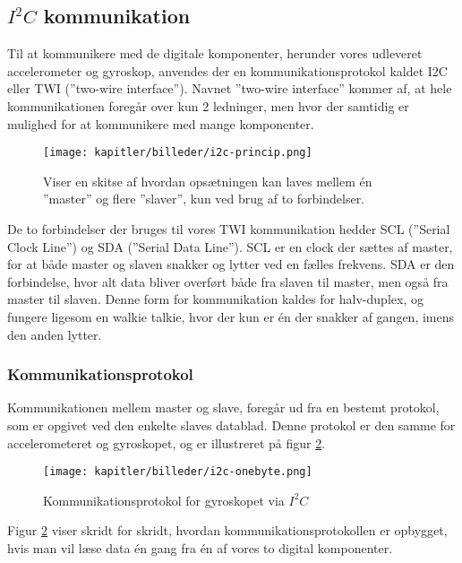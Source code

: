 \newpage

\subsection{$I^2C$ kommunikation}
Til at kommunikere med de digitale komponenter, herunder vores udleveret accelerometer og gyroskop, anvendes der en kommunikationsprotokol kaldet I2C eller TWI (”two-wire interface”). Navnet ”two-wire interface” kommer af, at hele kommunikationen foregår over kun 2 ledninger, men hvor der samtidig er mulighed for at kommunikere med mange komponenter.


\begin{figure}[ht]
    \centering
    \texttt{[image: kapitler/billeder/i2c-princip.png]}
    \caption{Viser en skitse af hvordan opsætningen kan laves mellem
én ”master” og flere ”slaver”, kun ved brug af to forbindelser.}
    \label{fig:i2cprincip}
\end{figure}


De to forbindelser der bruges til vores TWI kommunikation hedder SCL (”Serial Clock Line”) og SDA (”Serial Data Line”). SCL er en clock der sættes af master, for at både master og slaven snakker og lytter ved en fælles frekvens. SDA er den forbindelse, hvor alt data bliver overført både fra slaven til master, men også fra master til slaven. Denne form for kommunikation kaldes for halv-duplex, og fungere ligesom en walkie talkie, hvor der kun er én der snakker af gangen, imens den anden lytter.

\subsubsection{Kommunikationsprotokol}

Kommunikationen mellem master og slave, foregår ud fra en bestemt protokol, som er opgivet ved den enkelte slaves datablad. Denne protokol er den samme for accelerometeret og gyroskopet, og er illustreret på figur \ref{fig:i2conebyte}.

\begin{figure}[ht]
    \centering
    \texttt{[image: kapitler/billeder/i2c-onebyte.png]}
    \caption{Kommunikationsprotokol for gyroskopet via $I^2C$}
    \label{fig:i2conebyte}
\end{figure}

Figur \ref{fig:i2conebyte} viser skridt for skridt, hvordan kommunikationsprotokollen er opbygget, hvis man vil læse data én gang fra én af vores to digital komponenter.


